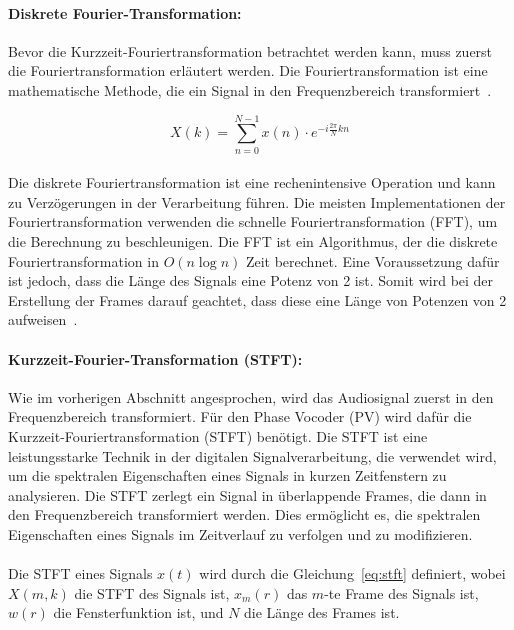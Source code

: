 \paragraph{Diskrete Fourier-Transformation:}
Bevor die Kurzzeit-Fouriertransformation betrachtet werden kann, muss zuerst die Fouriertransformation erläutert werden. Die Fouriertransformation ist eine mathematische Methode, die ein Signal in den Frequenzbereich transformiert~\cite{frey2013signal}.

\[
    X(k) = \sum_{n=0}^{N-1} x(n) \cdot e^{-i \frac{2\pi}{N} k n}
\]

\paragraph{}
Die diskrete Fouriertransformation ist eine rechenintensive Operation und kann zu Verzögerungen in der Verarbeitung führen. Die meisten Implementationen der Fouriertransformation verwenden die schnelle Fouriertransformation (FFT), um die Berechnung zu beschleunigen. Die FFT ist ein Algorithmus, der die diskrete Fouriertransformation in \(O(n \log n)\) Zeit berechnet. Eine Voraussetzung dafür ist jedoch, dass die Länge des Signals eine Potenz von 2 ist. Somit wird bei der Erstellung der Frames darauf geachtet, dass diese eine Länge von Potenzen von 2 aufweisen~\cite{Cooley1965AnAF}.

\paragraph{Kurzzeit-Fourier-Transformation (STFT):}
Wie im vorherigen Abschnitt angesprochen, wird das Audiosignal zuerst in den Frequenzbereich transformiert. Für den Phase Vocoder (PV) wird dafür die Kurzzeit-Fouriertransformation (STFT) benötigt. Die STFT ist eine leistungsstarke Technik in der digitalen Signalverarbeitung, die verwendet wird, um die spektralen Eigenschaften eines Signals in kurzen Zeitfenstern zu analysieren. Die STFT zerlegt ein Signal in überlappende Frames, die dann in den Frequenzbereich transformiert werden. Dies ermöglicht es, die spektralen Eigenschaften eines Signals im Zeitverlauf zu verfolgen und zu modifizieren.

\paragraph{}
Die STFT eines Signals $x(t)$ wird durch die Gleichung~\eqref{eq:stft} definiert, wobei $X(m,k)$ die STFT des Signals ist, $x_m(r)$ das $m$-te Frame des Signals ist, $w(r)$ die Fensterfunktion ist, und $N$ die Länge des Frames ist.


